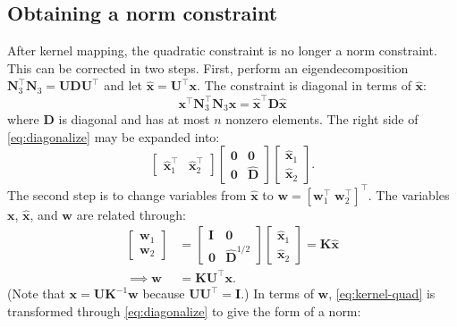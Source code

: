 \documentclass[journal,twoside]{IEEEtran}
\renewcommand{\vec}[1]{\mathbf{#1}}
\begin{document}
\subsection{Obtaining a norm constraint}\label{sec:solution-norm}
After kernel mapping, the quadratic constraint is no longer a norm constraint. This can be corrected in two steps. First, perform an eigendecomposition $\mathbf{N}_3^\top \mathbf{N}_3 = \mathbf{UDU}^\top$ and let $\hat{\vec{x}} = \mathbf{U}^\top \vec{x}$. The constraint is diagonal in terms of $\hat{\vec{x}}$:
\begin{equation}
\label{eq:diagonalize} \vec{x}^\top \mathbf{N}_3^\top \mathbf{N}_3 \vec{x} = \hat{\vec{x}}^\top \mathbf{D}\hat{\vec{x}}
\end{equation}
where $\mathbf{D}$ is diagonal and has at most $n$ nonzero elements. The right side of \eqref{eq:diagonalize} may be expanded into:
\begin{equation}
\begin{bmatrix}
\hat{\vec{x}}_1^\top & \hat{\vec{x}}_2^\top \end{bmatrix}
\begin{bmatrix} \mathbf{0} & \mathbf{0} \\ \mathbf{0} & \hat{\mathbf{D}} \end{bmatrix}
\begin{bmatrix}
\hat{\vec{x}}_1 \\ \hat{\vec{x}}_2
\end{bmatrix}.
\end{equation}
The second step is to change variables from $\hat{\vec{x}}$ to $\vec{w} = [\vec{w}_1^\top \; \vec{w}_2^\top]^\top$. The variables $\vec{x}$, $\hat{\vec{x}}$, and $\vec{w}$ are
related through:
\begin{align}
\label{eq:x_to_w} \begin{bmatrix} \vec{w}_1 \\ \vec{w}_2 \end{bmatrix} &=
\begin{bmatrix} \mathbf{I} & \mathbf{0} \\ \mathbf{0} & \hat{\mathbf{D}}^{1/2} \end{bmatrix}
\begin{bmatrix} \hat{\vec{x}}_1 \\ \hat{\vec{x}}_2 \end{bmatrix} = \mathbf{K}\hat{\vec{x}} \\
\nonumber \implies \vec{w} &= \mathbf{KU}^\top \vec{x}.
\end{align}
(Note that $\vec{x} = \mathbf{U}\mathbf{K}^{-1}\vec{w}$ because $\mathbf{UU}^\top = \mathbf{I}$.) In terms of $\vec{w}$, \eqref{eq:kernel-quad} is transformed through \eqref{eq:diagonalize} to give the form of a norm:
\end{document}
